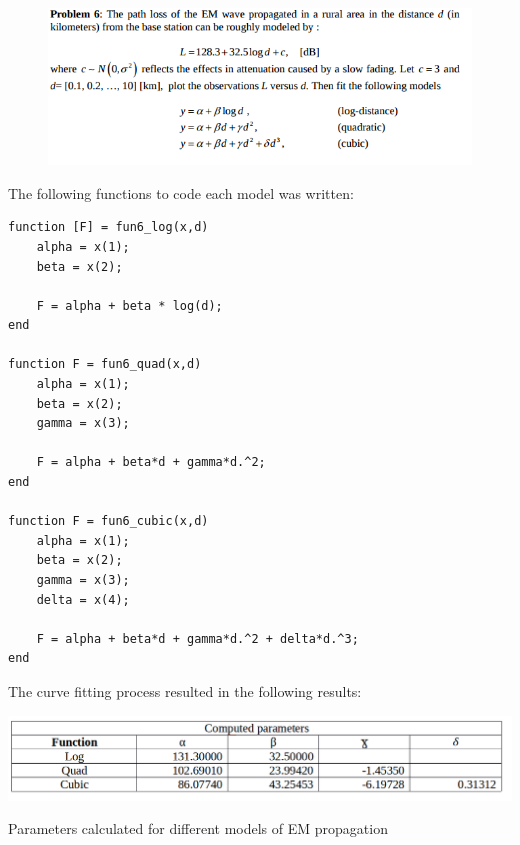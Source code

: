 \documentclass[eng,openany]{mgr}
\begin{document}
\clearpage
\begin{figure}[h]
\centering
\includegraphics[width=0.7\linewidth]{screenshot010}
\label{fig:screenshot010}
\end{figure}

The following functions to code each model was written:
\begin{lstlisting}
function [F] = fun6_log(x,d)
	alpha = x(1);
	beta = x(2);
	
	F = alpha + beta * log(d);
end

function F = fun6_quad(x,d)
	alpha = x(1);
	beta = x(2);
	gamma = x(3);
	
	F = alpha + beta*d + gamma*d.^2;
end

function F = fun6_cubic(x,d)
	alpha = x(1);
	beta = x(2);
	gamma = x(3);
	delta = x(4);
	
	F = alpha + beta*d + gamma*d.^2 + delta*d.^3;
end
\end{lstlisting}
The curve fitting process resulted in the following results:
\begin{table}[h]
\centering
\includegraphics[width=1\linewidth]{screenshot012}
\caption{Parameters calculated for different models of EM propagation}
\label{fig:screenshot012}
\end{table}
\end{document}
